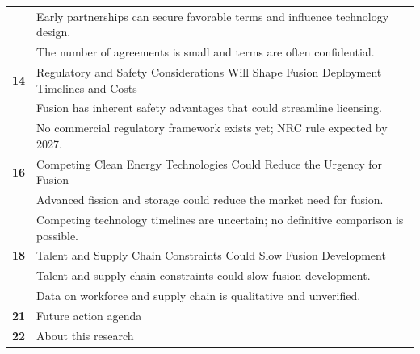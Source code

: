 \documentclass[10pt,a4paper]{article}
\begin{document}
\begin{tabularx}{\linewidth}{p{14mm}Y}
 & {\scriptsize\color{BOMuted} Early partnerships can secure favorable terms and influence technology design.} \\[1pt]
 & {\scriptsize\color{BOMuted} The number of agreements is small and terms are often confidential.} \\[1pt]
\textcolor{BOGreen}{\bfseries 14} & Regulatory and Safety Considerations Will Shape Fusion Deployment Timelines and Costs \\[5pt]
 & {\scriptsize\color{BOMuted} Fusion has inherent safety advantages that could streamline licensing.} \\[1pt]
 & {\scriptsize\color{BOMuted} No commercial regulatory framework exists yet; NRC rule expected by 2027.} \\[1pt]
\textcolor{BOGreen}{\bfseries 16} & Competing Clean Energy Technologies Could Reduce the Urgency for Fusion \\[5pt]
 & {\scriptsize\color{BOMuted} Advanced fission and storage could reduce the market need for fusion.} \\[1pt]
 & {\scriptsize\color{BOMuted} Competing technology timelines are uncertain; no definitive comparison is possible.} \\[1pt]
\textcolor{BOGreen}{\bfseries 18} & Talent and Supply Chain Constraints Could Slow Fusion Development \\[5pt]
 & {\scriptsize\color{BOMuted} Talent and supply chain constraints could slow fusion development.} \\[1pt]
 & {\scriptsize\color{BOMuted} Data on workforce and supply chain is qualitative and unverified.} \\[1pt]
\textcolor{BOGreen}{\bfseries 21} & Future action agenda \\[5pt]
\textcolor{BOGreen}{\bfseries 22} & About this research \\[5pt]
\end{tabularx}
\clearpage
\end{document}
